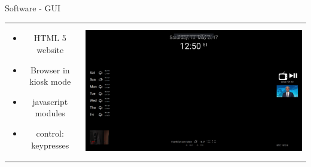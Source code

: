 \documentclass[xcolor=svgnames,handout,aspectratio=169]{beamer}
\begin{document}
\begin{frame}
	{Software - GUI}
	\begin{tabular}{cl}  
			\parbox{0.35\linewidth}{
				\begin{itemize}
					\item HTML 5 website
					\item Browser in kiosk mode
					\item javascript modules
					\item control: keypresses
				\end{itemize}
			}&
			\parbox{0.6\linewidth}{			
				\includegraphics[width=\linewidth]{images/gui.png}
			}
		\end{tabular}
\end{frame}
\end{document}
